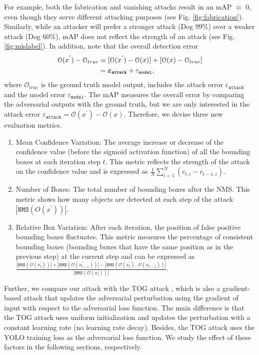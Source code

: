 For example, both the fabrication and vanishing attacks result in an mAP $\approx$ 0, even though they serve different attacking purposes (see Fig. \ref{fig:fabrication}). Similarly, while an attacker will prefer a stronger attack (Dog 99\%) over a weaker attack (Dog 60\%), mAP does not reflect the strength of an attack (see Fig. \ref{fig:mislabel}).
In addition, note that the overall detection error 
\begin{align}
\begin{split}
\mathcal{O}(x^{'}) - \mathcal{O}_{true} & = [\mathcal{O}(x^{'}) - \mathcal{O}(x)] + [\mathcal{O}(x) - \mathcal{O}_{true}] \\
& = \bm{\varepsilon}_{\textbf{\texttt{attack}}} + \varepsilon_{\texttt{model}},
\end{split}
\end{align}
where $\mathcal{O}_{true}$ is the ground truth model output, includes the attack error $\varepsilon_{\texttt{attack}}$ and the model error $\varepsilon_{\texttt{model}}$. The mAP measures the overall error by comparing the adversarial outputs with the ground truth, but we are only interested in the attack error $\varepsilon_{\texttt{attack}}=\mathcal{O}(x^{'}) - \mathcal{O}(x)$.
Therefore, we devise three new evaluation metrics. 
\begin{enumerate}
    \item Mean Confidence Variation: The average increase or decrease of the confidence value (before the sigmoid activation function) of all the bounding boxes at each iteration step $t$. This metric reflects the strength of the attack on the confidence value and is expressed as $\frac{1}{N}\sum_{i=1}^{N}{( c_{t,i} - c_{t-1,i} )}$.
    \item Number of Boxes: The total number of bounding boxes after the NMS. This metric shows how many objects are detected at each step of the attack $|\texttt{NMS}(O(x^{'}))|$.
    \item Relative Box Variation: After each iteration, the position of false positive bounding boxes fluctuates. This metric measures the percentage of consistent bounding boxes (bounding boxes that have the same position as in the previous step) at the current step and can be expressed as $\frac{|\texttt{NMS}(\mathcal{O}(x_t^{'}))| + |\texttt{NMS}(\mathcal{O}(x_{t-1}^{'}))| - |\texttt{NMS}(\mathcal{O}(x_{t}^{'}),\ \mathcal{O}(x_{t-1}^{'}))|}{|\texttt{NMS}(\mathcal{O}(x_t^{'}))|}$.
\end{enumerate}

Further, we compare our attack with the TOG attack \cite{chow2020adversarial}, which is also a gradient-based attack that updates the adversarial perturbation using the gradient of input with respect to the adversarial loss function. The main difference is that the TOG attack uses uniform initialization and updates the perturbation with a constant learning rate (no learning rate decay). Besides, the TOG attack uses the YOLO training loss \cite{redmon2018yolov3, bochkovskiy2020yolov4} as the adversarial loss function. We study the effect of these factors in the following sections, respectively.


